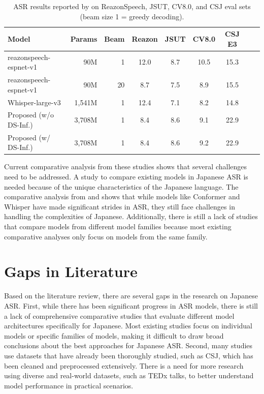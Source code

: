 \begin{table}[H]
\centering
\caption{ASR results reported by \cite{hono2024integratingpretrainedspeechlanguage} on ReazonSpeech, JSUT, CV8.0, and CSJ eval sets (beam size 1 = greedy decoding).}
\label{tab:hono_asr_comparison}
{\small
\setlength{\tabcolsep}{4pt}
\renewcommand{\arraystretch}{1.2}
\begin{tabular}{l|r|r|c|c|c|c|c|c}
\hline
\textbf{Model} & \textbf{Params} & \textbf{Beam} & \textbf{Reazon} & \textbf{JSUT} & \textbf{CV8.0} & \textbf{CSJ E3} \\
\hline
reazonspeech-espnet-v1 & 90M   & 1  & 12.0 & 8.7 & 10.5 &  15.3 \\
reazonspeech-espnet-v1 & 90M   & 20 & 8.7  & 7.5 & 8.9  &  15.5 \\
Whisper-large-v3       & 1,541M& 1  & 12.4 & 7.1 & 8.2  &  14.8 \\
Proposed (w/o DS-Inf.) & 3,708M& 1  & 8.4  & 8.6 & 9.1  &  22.9 \\
Proposed (w/ DS-Inf.)  & 3,708M& 1  & 8.4  & 8.6 & 9.2  &  22.9 \\
\hline
\end{tabular}
}
\end{table}

Current comparative analysis from these studies shows that several challenges need to be addressed. A study to compare existing models in Japanese ASR is needed because of the unique characteristics of the Japanese language. The comparative analysis from \textcite{Karita2021} and \textcite{takahashi2024comparison} shows that while models like Conformer and Whisper have made significant strides in ASR, they still face challenges in handling the complexities of Japanese. Additionally, there is still a lack of studies that compare models from different model families because most existing comparative analyses only focus on models from the same family.

\section{Gaps in Literature}
Based on the literature review, there are several gaps in the research on Japanese ASR. First, while there has been significant progress in ASR models, there is still a lack of comprehensive comparative studies that evaluate different model architectures specifically for Japanese. Most existing studies focus on individual models or specific families of models, making it difficult to draw broad conclusions about the best approaches for Japanese ASR. Second, many studies use datasets that have already been thoroughly studied, such as CSJ, which has been cleaned and preprocessed extensively. There is a need for more research using diverse and real-world datasets, such as TEDx talks, to better understand model performance in practical scenarios.

